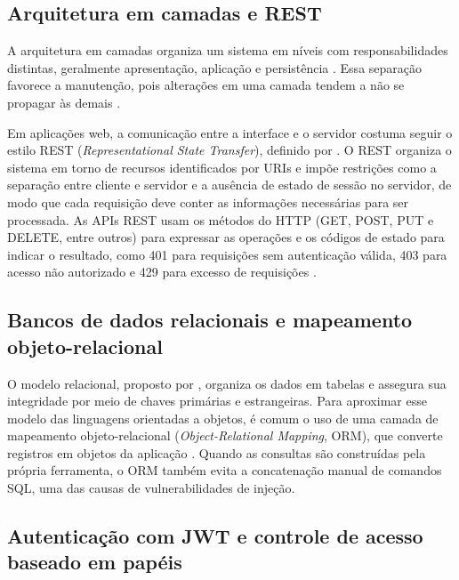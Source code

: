 \subsection{Arquitetura em camadas e REST}\label{sec:fund_arquitetura}

A arquitetura em camadas organiza um sistema em níveis com responsabilidades distintas, geralmente apresentação, aplicação e persistência \cite{fowler2002_patterns}. Essa separação favorece a manutenção, pois alterações em uma camada tendem a não se propagar às demais \cite{sommerville2018_engenharia_software}.

Em aplicações web, a comunicação entre a interface e o servidor costuma seguir o estilo REST (\textit{Representational State Transfer}), definido por . O REST organiza o sistema em torno de recursos identificados por URIs e impõe restrições como a separação entre cliente e servidor e a ausência de estado de sessão no servidor, de modo que cada requisição deve conter as informações necessárias para ser processada. As APIs REST usam os métodos do HTTP (GET, POST, PUT e DELETE, entre outros) para expressar as operações e os códigos de estado para indicar o resultado, como 401 para requisições sem autenticação válida, 403 para acesso não autorizado e 429 para excesso de requisições \cite{rfc9110_http}.

\subsection{Bancos de dados relacionais e mapeamento objeto-relacional}\label{sec:fund_banco}

O modelo relacional, proposto por , organiza os dados em tabelas e assegura sua integridade por meio de chaves primárias e estrangeiras. Para aproximar esse modelo das linguagens orientadas a objetos, é comum o uso de uma camada de mapeamento objeto-relacional (\textit{Object-Relational Mapping}, ORM), que converte registros em objetos da aplicação \cite{fowler2002_patterns}. Quando as consultas são construídas pela própria ferramenta, o ORM também evita a concatenação manual de comandos SQL, uma das causas de vulnerabilidades de injeção.

\subsection{Autenticação com JWT e controle de acesso baseado em papéis}\label{sec:fund_seguranca}

